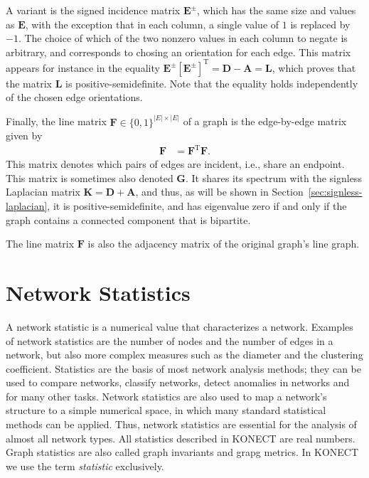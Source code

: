 \documentclass{article}
\begin{document}
A variant is the signed incidence matrix $\mathbf E^{\pm}$, which has
the same size and values as $\mathbf E$, with the exception that in each
column, a single value of $1$ is replaced by $-1$.  The choice of which
of the two nonzero values in each column to negate is arbitrary, and
corresponds to chosing an orientation for each edge.  
This matrix appears
for instance in the equality $\mathbf E^{\pm} [\mathbf E^{\pm}]^{\mathrm
  T} = \mathbf D - \mathbf A = \mathbf L$, which proves that the matrix
$\mathbf L$ is positive-semidefinite.  Note that the equality holds
independently of the chosen edge orientations. 

Finally, the line matrix $\mathbf F \in \{0,1\}^{|E|\times|E|}$ of a graph is the edge-by-edge
matrix given by 
\begin{align*}
  \mathbf F &= \mathbf F^{\mathrm T} \mathbf F.
\end{align*}
This matrix denotes which pairs of edges are incident, i.e., share an
endpoint.  This matrix is sometimes also denoted $\mathbf G$.  It shares
its spectrum with the signless Laplacian matrix $\mathbf K = \mathbf D +
\mathbf A$, and thus, as will be shown in
Section~\ref{sec:signless-laplacian}, it is positive-semidefinite, and
has eigenvalue zero if and only if the graph contains a connected
component that is bipartite. 

The line matrix $\mathbf F$ is also the adjacency matrix of the original
graph's line graph. 

\section{Network Statistics}
\label{sec:statistics}
A network statistic is a numerical value that characterizes a network.
Examples of network statistics are the number of nodes and the number of
edges in a network, but also more complex measures such as the diameter and the
clustering coefficient.  
Statistics are the basis of most network analysis methods; they can be
used to compare networks, classify networks, detect anomalies in
networks and for many other tasks.  Network statistics are also used to
map a network's structure 
to a simple numerical space, in which many standard statistical
methods can be applied.  Thus, network statistics are essential for the
analysis of almost all network types. 
All statistics described in KONECT are real numbers.
Graph statistics are also called graph invariants and grapg metrics.  In
KONECT we use the term \emph{statistic} exclusively. 
\end{document}

